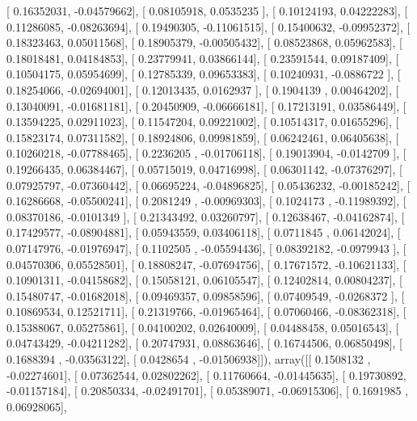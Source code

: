 \documentclass{article}
\begin{document}
       [ 0.16352031, -0.04579662],
       [ 0.08105918,  0.0535235 ],
       [ 0.10124193,  0.04222283],
       [ 0.11286085, -0.08263694],
       [ 0.19490305, -0.11061515],
       [ 0.15400632, -0.09952372],
       [ 0.18323463,  0.05011568],
       [ 0.18905379, -0.00505432],
       [ 0.08523868,  0.05962583],
       [ 0.18018481,  0.04184853],
       [ 0.23779941,  0.03866144],
       [ 0.23591544,  0.09187409],
       [ 0.10504175,  0.05954699],
       [ 0.12785339,  0.09653383],
       [ 0.10240931, -0.0886722 ],
       [ 0.18254066, -0.02694001],
       [ 0.12013435,  0.0162937 ],
       [ 0.1904139 ,  0.00464202],
       [ 0.13040091, -0.01681181],
       [ 0.20450909, -0.06666181],
       [ 0.17213191,  0.03586449],
       [ 0.13594225,  0.02911023],
       [ 0.11547204,  0.09221002],
       [ 0.10514317,  0.01655296],
       [ 0.15823174,  0.07311582],
       [ 0.18924806,  0.09981859],
       [ 0.06242461,  0.06405638],
       [ 0.10260218, -0.07788465],
       [ 0.2236205 , -0.01706118],
       [ 0.19013904, -0.0142709 ],
       [ 0.19266435,  0.06384467],
       [ 0.05715019,  0.04716998],
       [ 0.06301142, -0.07376297],
       [ 0.07925797, -0.07360442],
       [ 0.06695224, -0.04896825],
       [ 0.05436232, -0.00185242],
       [ 0.16286668, -0.05500241],
       [ 0.2081249 , -0.00969303],
       [ 0.1024173 , -0.11989392],
       [ 0.08370186, -0.0101349 ],
       [ 0.21343492,  0.03260797],
       [ 0.12638467, -0.04162874],
       [ 0.17429577, -0.08904881],
       [ 0.05943559,  0.03406118],
       [ 0.0711845 ,  0.06142024],
       [ 0.07147976, -0.01976947],
       [ 0.1102505 , -0.05594436],
       [ 0.08392182, -0.0979943 ],
       [ 0.04570306,  0.05528501],
       [ 0.18808247, -0.07694756],
       [ 0.17671572, -0.10621133],
       [ 0.10901311, -0.04158682],
       [ 0.15058121,  0.06105547],
       [ 0.12402814,  0.00804237],
       [ 0.15480747, -0.01682018],
       [ 0.09469357,  0.09858596],
       [ 0.07409549, -0.0268372 ],
       [ 0.10869534,  0.12521711],
       [ 0.21319766, -0.01965464],
       [ 0.07060466, -0.08362318],
       [ 0.15388067,  0.05275861],
       [ 0.04100202,  0.02640009],
       [ 0.04488458,  0.05016543],
       [ 0.04743429, -0.04211282],
       [ 0.20747931,  0.08863646],
       [ 0.16744506,  0.06850498],
       [ 0.1688394 , -0.03563122],
       [ 0.0428654 , -0.01506938]]), array([[ 0.1508132 , -0.02274601],
       [ 0.07362544,  0.02802262],
       [ 0.11760664, -0.01445635],
       [ 0.19730892, -0.01157184],
       [ 0.20850334, -0.02491701],
       [ 0.05389071, -0.06915306],
       [ 0.1691985 ,  0.06928065],
\end{document}

